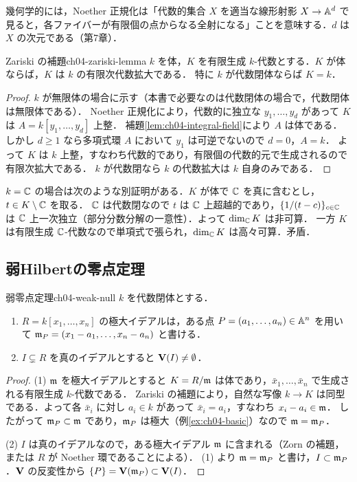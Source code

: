 幾何学的には，Noether 正規化は「代数的集合 $X$ を適当な線形射影 $X\to\mathbb{A}^d$ で見ると，各ファイバーが有限個の点からなる全射になる」ことを意味する．$d$ は $X$ の次元である（第7章）．

\begin{mylem}{Zariski の補題}{ch04-zariski-lemma}
$k$ を体，$K$ を有限生成 $k$-代数とする．$K$ が体ならば，$K$ は $k$ の有限次代数拡大である．
特に $k$ が代数閉体ならば $K=k$．
\end{mylem}

\begin{proof}
$k$ が無限体の場合に示す（本書で必要なのは代数閉体の場合で，代数閉体は無限体である）．
Noether 正規化により，代数的に独立な $y_1,\dots,y_d$ があって $K$ は $A=k[y_1,\dots,y_d]$ 上整．
補題\ref{lem:ch04-integral-field}により $A$ は体である．しかし $d\ge1$ なら多項式環 $A$ において $y_1$ は可逆でないので $d=0$，$A=k$．
よって $K$ は $k$ 上整，すなわち代数的であり，有限個の代数的元で生成されるので有限次拡大である．
$k$ が代数閉なら $k$ の代数拡大は $k$ 自身のみである．
\end{proof}

\begin{note}
$k=\mathbb{C}$ の場合は次のような別証明がある．$K$ が体で $\mathbb{C}$ を真に含むとし，$t\in K\setminus\mathbb{C}$ を取る．
$\mathbb{C}$ は代数閉なので $t$ は $\mathbb{C}$ 上超越的であり，$\{1/(t-c)\}_{c\in\mathbb{C}}$ は $\mathbb{C}$ 上一次独立（部分分数分解の一意性）．よって $\dim_{\mathbb{C}} K$ は非可算．
一方 $K$ は有限生成 $\mathbb{C}$-代数なので単項式で張られ，$\dim_{\mathbb{C}} K$ は高々可算．矛盾．
\end{note}

\subsection{弱Hilbertの零点定理}

\begin{mythm}{弱零点定理}{ch04-weak-null}
$k$ を代数閉体とする．
\begin{enumerate}
  \item $R=k[x_1,\dots,x_n]$ の極大イデアルは，ある点 $P=(a_1,\dots,a_n)\in\mathbb{A}^n$ を用いて $\mathfrak{m}_P=(x_1-a_1,\dots,x_n-a_n)$ と書ける．
  \item $I\subsetneq R$ を真のイデアルとすると $\mathbf{V}(I)\ne\emptyset$．
\end{enumerate}
\end{mythm}

\begin{proof}
(1) $\mathfrak{m}$ を極大イデアルとすると $K=R/\mathfrak{m}$ は体であり，$\bar x_1,\dots,\bar x_n$ で生成される有限生成 $k$-代数である．
Zariski の補題により，自然な写像 $k\to K$ は同型である．よって各 $\bar x_i$ に対し $a_i\in k$ があって $\bar x_i=a_i$，すなわち $x_i-a_i\in\mathfrak{m}$．
したがって $\mathfrak{m}_P\subset\mathfrak{m}$ であり，$\mathfrak{m}_P$ は極大（例\ref{ex:ch04-basic}）なので $\mathfrak{m}=\mathfrak{m}_P$．

(2) $I$ は真のイデアルなので，ある極大イデアル $\mathfrak{m}$ に含まれる（Zorn の補題，または $R$ が Noether 環であることによる）．
(1) より $\mathfrak{m}=\mathfrak{m}_P$ と書け，$I\subset\mathfrak{m}_P$．$\mathbf{V}$ の反変性から $\{P\}=\mathbf{V}(\mathfrak{m}_P)\subset\mathbf{V}(I)$．
\end{proof}

